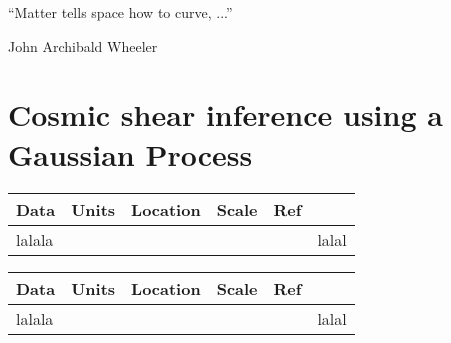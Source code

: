 \documentclass[ucdthesis.tex]{subfiles}
\begin{document}
    \epigraph{``Matter tells space how to curve, ...''}{John Archibald Wheeler} 
    
    \doublespacing
		\setcounter{chapter}{3}
		\chapter{Cosmic shear inference using a Gaussian Process}{}{}
		\label{chapter4}

\begin{table}
\begin{center} 
\begin{tabular}{@{}lccccc}
\hline \hline Data & Units & Location & Scale & Ref \\ \hline
	lalala & & &&& lalal\\
\hline 
\end{tabular} 
\end{center} 
\end{table} 

\begin{table}
\begin{center} 
\begin{tabular}{@{}lccccc}
\hline \hline Data & Units & Location & Scale & Ref \\ \hline
	lalala & & &&& lalal\\
\hline 
\end{tabular} 
\end{center} 
\label{tab:inputs} 
\end{table} 
						 

        
\end{document}
